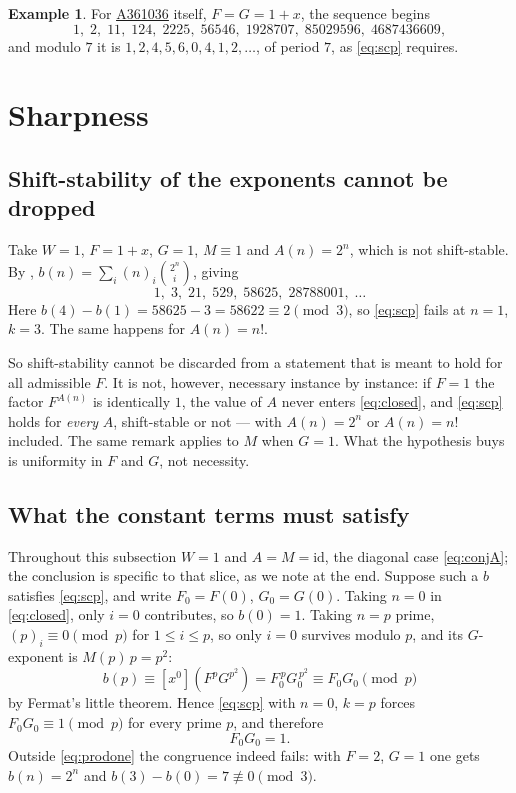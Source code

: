 \documentclass[11pt,a4paper]{article}
\theoremstyle{plain}
\theoremstyle{definition}
\newtheorem{example}[theorem]{Example}
\newcommand{\ff}[2]{(#1)_{#2}}
\newcommand{\coeff}[1]{[x^{#1}]}
\newcommand{\oeis}[1]{\href{https://oeis.org/#1}{\underline{#1}}}
\begin{document}
\begin{example}
For \oeis{A361036} itself, $F=G=1+x$, the sequence begins
\[
  1,\; 2,\; 11,\; 124,\; 2225,\; 56546,\; 1928707,\; 85029596,\; 4687436609,
\]
and modulo $7$ it is $1,2,4,5,6,0,4,1,2,\dots$, of period $7$, as
\eqref{eq:scp} requires.
\end{example}

\section{Sharpness}\label{sec:sharp}

\subsection{Shift-stability of the exponents cannot be dropped}

Take $W=1$, $F=1+x$, $G=1$, $M\equiv1$ and $A(n)=2^{n}$, which is not shift-stable. By
, $b(n)=\sum_{i}\ff{n}{i}\binom{2^{n}}{i}$, giving
\[
  1,\;3,\;21,\;529,\;58625,\;28788001,\;\dots
\]
Here $b(4)-b(1)=58625-3=58622\equiv2\pmod 3$, so \eqref{eq:scp} fails at $n=1$, $k=3$.
The same happens for $A(n)=n!$.

So shift-stability cannot be discarded from a statement that is meant to hold for all
admissible $F$. It is not, however, necessary instance by instance: if $F=1$ the factor
$F^{A(n)}$ is identically $1$, the value of $A$ never enters \eqref{eq:closed}, and
\eqref{eq:scp} holds for \emph{every} $A$, shift-stable or not --- with $A(n)=2^{n}$ or
$A(n)=n!$ included. The same remark applies to $M$ when $G=1$. What the hypothesis buys
is uniformity in $F$ and $G$, not necessity.

\subsection{What the constant terms must satisfy}\label{sec:sharpconst}

Throughout this subsection $W=1$ and $A=M=\mathrm{id}$, the diagonal case
\eqref{eq:conjA}; the conclusion is specific to that slice, as we note at the end.
Suppose such a $b$ satisfies \eqref{eq:scp}, and write $F_0=F(0)$, $G_0=G(0)$. Taking
$n=0$ in \eqref{eq:closed}, only $i=0$ contributes, so $b(0)=1$. Taking $n=p$ prime,
$\ff{p}{i}\equiv0\pmod p$ for $1\le i\le p$, so only $i=0$ survives modulo $p$, and its
$G$-exponent is $M(p)\,p=p^{2}$:
\[
  b(p)\equiv \coeff{0}\!\left(F^{p}G^{p^{2}}\right)=F_0^{\,p}G_0^{\,p^{2}}\equiv F_0G_0 \pmod p
\]
by Fermat's little theorem. Hence \eqref{eq:scp} with $n=0$, $k=p$ forces
$F_0G_0\equiv1\pmod p$ for every prime $p$, and therefore
\begin{equation}\label{eq:prodone}
  F_0G_0=1 .
\end{equation}
Outside \eqref{eq:prodone} the congruence indeed fails: with $F=2$, $G=1$ one gets
$b(n)=2^{n}$ and $b(3)-b(0)=7\not\equiv0\pmod 3$.
\end{document}
